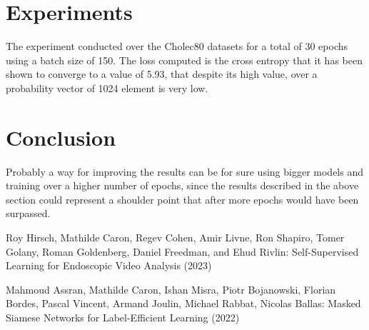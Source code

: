\documentclass[column]{article}
\begin{document}
		
	\begin{multicols}{2}
		
	\section{Experiments}
	
	The experiment conducted over the Cholec80 datasets for a total of 30 epochs using a batch size of 150. The loss computed is the cross entropy that it has been shown to converge to a value of 5.93, that despite its high value, over a probability vector of 1024 element is very low. 
	
	\section{Conclusion}
	
	Probably a way for improving the results can be for sure using bigger models and training over a higher number of epochs, since the results described in the above section could represent a shoulder point that after more epochs would have been surpassed.
		
	\end{multicols}
	
	
	

	
	\begin{thebibliography}{9}
		
		Roy Hirsch, Mathilde Caron, Regev Cohen, Amir Livne, Ron Shapiro, Tomer Golany, Roman Goldenberg, Daniel Freedman, and Ehud Rivlin: Self-Supervised Learning for Endoscopic Video Analysis (2023)
		
		Mahmoud Assran, Mathilde Caron, Ishan Misra, Piotr Bojanowski, Florian Bordes, Pascal Vincent, Armand Joulin,  Michael Rabbat, Nicolas Ballas: Masked Siamese Networks for Label-Efficient Learning (2022)
		
	\end{thebibliography}
	
\end{document}
